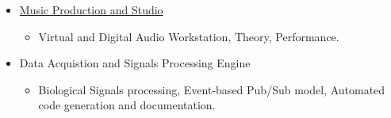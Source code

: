 \documentclass{article}
\begin{document}
\begin{itemize}
\begin{itemize}
          \item \href{https://soundcloud.com/lintelstudio}{Music Production and Studio} 
            \begin{itemize}
              \item Virtual and Digital Audio Workstation, Theory, Performance.
            \end{itemize}
                        
          \item Data Acquistion and Signals Processing Engine
            \begin{itemize}
              \item Biological Signals processing, Event-based Pub/Sub model, Automated code generation and documentation. 
            \end{itemize}






\end{itemize}
\end{itemize}
\end{document}
